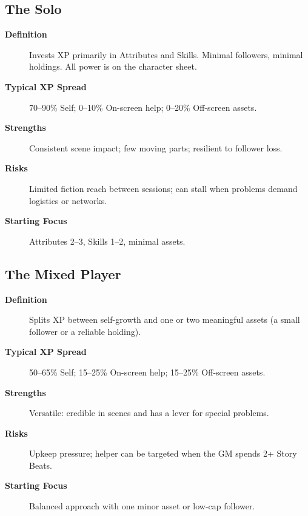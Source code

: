 \subsection{The Solo}
\label{subsec:solo-archetype}

\begin{description}
\item[\textbf{Definition}] Invests XP primarily in Attributes and Skills. Minimal followers, minimal holdings. All power is on the character sheet.
\item[\textbf{Typical XP Spread}] 70--90\% Self; 0--10\% On-screen help; 0--20\% Off-screen assets.
\item[\textbf{Strengths}] Consistent scene impact; few moving parts; resilient to follower loss.
\item[\textbf{Risks}] Limited fiction reach between sessions; can stall when problems demand logistics or networks.
\item[\textbf{Starting Focus}] Attributes 2--3, Skills 1--2, minimal assets.
\end{description}

\subsection{The Mixed Player}
\label{subsec:mixed-archetype}

\begin{description}
\item[\textbf{Definition}] Splits XP between self-growth and one or two meaningful assets (a small follower or a reliable holding).
\item[\textbf{Typical XP Spread}] 50--65\% Self; 15--25\% On-screen help; 15--25\% Off-screen assets.
\item[\textbf{Strengths}] Versatile: credible in scenes and has a lever for special problems.
\item[\textbf{Risks}] Upkeep pressure; helper can be targeted when the GM spends 2+ Story Beats.
\item[\textbf{Starting Focus}] Balanced approach with one minor asset or low-cap follower.
\end{description}


